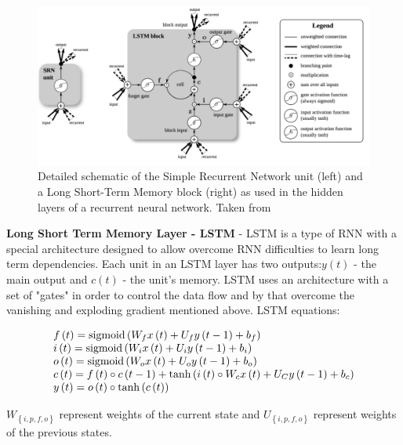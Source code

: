\documentclass[
12pt, %
english, %
doublespacing, %
headsepline, %
]{MastersDoctoralThesis} %
\begin{document}
\begin{figure}
	\centering
	\includegraphics[width=1.0\linewidth]{LSTM_RNN_placeholder_clear.png}
	\caption{Detailed schematic of the Simple Recurrent Network unit (left) and a Long Short-Term Memory block (right) as used
		in the hidden layers of a recurrent neural network. Taken from \cite{ greff2017lstm}}
	
	
	\label{fig:RNN-rolled}
\end{figure}
\textbf{Long Short Term Memory Layer - LSTM} - LSTM is a type of RNN with a special architecture designed to allow overcome RNN difficulties to learn long term dependencies. Each unit in an LSTM layer has two outputs:$y(t)$ - the main output and $c(t)$ - the unit's memory. LSTM uses an architecture with a set of "gates" in order to control the data flow and by that overcome the vanishing and exploding gradient mentioned above. LSTM equations:

\[\begin{array}{l}
f\left( t \right) = {\rm{sigmoid}}\left( {{W_f}x\left( t \right) + {U_f}y\left( {t - 1} \right) + {b_f}} \right)\\
i\left( t \right) = {\rm{sigmoid}}\left( {{W_i}x\left( t \right) + {U_i}y\left( {t - 1} \right) + {b_i}} \right)\\
o\left( t \right) = {\rm{sigmoid}}\left( {{W_o}x\left( t \right) + {U_o}y\left( {t - 1} \right) + {b_o}} \right)\\
c\left( t \right) = f\left( t \right) \circ c\left( {t - 1} \right) + \tanh \left( {i\left( t \right) \circ {W_c}x\left( t \right) + {U_C}y\left( {t - 1} \right) + {b_c}} \right)\\
y\left( t \right) = o\left( t \right) \circ \tanh \left( {c\left( t \right)} \right)
\end{array}\]

${W_{\left\{ {i,p,f,o} \right\}}}$ represent weights of the current state and  ${U_{\left\{ {i,p,f,o} \right\}}}$ represent weights of the previous states. 
\end{document}
